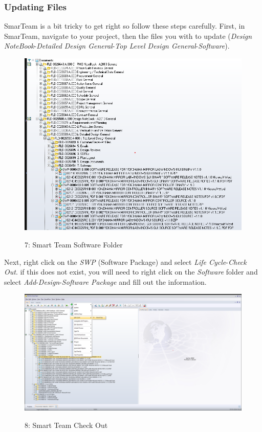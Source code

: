 \documentclass[10pt]{article}
\begin{document}
            \subsubsection{Updating Files}
                SmarTeam is a bit tricky to get right so follow these steps carefully. First, in SmarTeam, navigate to your project, then the files you with to update (\emph{Design NoteBook}-\emph{Detailed Design General}-\emph{Top Level Design General}-\emph{Software}).
                \begin{figure}[H]
                    \centerline{\includegraphics[width=\textwidth]{References/ST Software Folder.png}}
                    \figurename{ 7: Smart Team Software Folder}
                \end{figure}
                Next, right click on the \emph{SWP} (Software Package) and select \emph{Life Cycle}-\emph{Check Out}. if this does not exist, you will need to right click on the \emph{Software} folder and select \emph{Add}-\emph{Design}-\emph{Software Package} and fill out the information.
                \begin{figure}[H]
                    \centerline{\includegraphics[width=\textwidth]{References/ST Check Out.png}}
                    \figurename{ 8: Smart Team Check Out}
                \end{figure}
\end{document}
